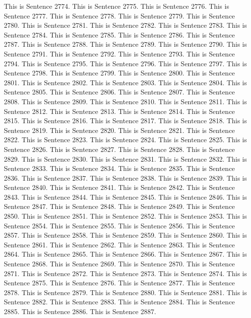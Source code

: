 \documentclass{article}
\begin{document}
This is Sentence 2774.
This is Sentence 2775.
This is Sentence 2776.
This is Sentence 2777.
This is Sentence 2778.
This is Sentence 2779.
This is Sentence 2780.
This is Sentence 2781.
This is Sentence 2782.
This is Sentence 2783.
This is Sentence 2784.
This is Sentence 2785.
This is Sentence 2786.
This is Sentence 2787.
This is Sentence 2788.
This is Sentence 2789.
This is Sentence 2790.
This is Sentence 2791.
This is Sentence 2792.
This is Sentence 2793.
This is Sentence 2794.
This is Sentence 2795.
This is Sentence 2796.
This is Sentence 2797.
This is Sentence 2798.
This is Sentence 2799.
This is Sentence 2800.
This is Sentence 2801.
This is Sentence 2802.
This is Sentence 2803.
This is Sentence 2804.
This is Sentence 2805.
This is Sentence 2806.
This is Sentence 2807.
This is Sentence 2808.
This is Sentence 2809.
This is Sentence 2810.
This is Sentence 2811.
This is Sentence 2812.
This is Sentence 2813.
This is Sentence 2814.
This is Sentence 2815.
This is Sentence 2816.
This is Sentence 2817.
This is Sentence 2818.
This is Sentence 2819.
This is Sentence 2820.
This is Sentence 2821.
This is Sentence 2822.
This is Sentence 2823.
This is Sentence 2824.
This is Sentence 2825.
This is Sentence 2826.
This is Sentence 2827.
This is Sentence 2828.
This is Sentence 2829.
This is Sentence 2830.
This is Sentence 2831.
This is Sentence 2832.
This is Sentence 2833.
This is Sentence 2834.
This is Sentence 2835.
This is Sentence 2836.
This is Sentence 2837.
This is Sentence 2838.
This is Sentence 2839.
This is Sentence 2840.
This is Sentence 2841.
This is Sentence 2842.
This is Sentence 2843.
This is Sentence 2844.
This is Sentence 2845.
This is Sentence 2846.
This is Sentence 2847.
This is Sentence 2848.
This is Sentence 2849.
This is Sentence 2850.
This is Sentence 2851.
This is Sentence 2852.
This is Sentence 2853.
This is Sentence 2854.
This is Sentence 2855.
This is Sentence 2856.
This is Sentence 2857.
This is Sentence 2858.
This is Sentence 2859.
This is Sentence 2860.
This is Sentence 2861.
This is Sentence 2862.
This is Sentence 2863.
This is Sentence 2864.
This is Sentence 2865.
This is Sentence 2866.
This is Sentence 2867.
This is Sentence 2868.
This is Sentence 2869.
This is Sentence 2870.
This is Sentence 2871.
This is Sentence 2872.
This is Sentence 2873.
This is Sentence 2874.
This is Sentence 2875.
This is Sentence 2876.
This is Sentence 2877.
This is Sentence 2878.
This is Sentence 2879.
This is Sentence 2880.
This is Sentence 2881.
This is Sentence 2882.
This is Sentence 2883.
This is Sentence 2884.
This is Sentence 2885.
This is Sentence 2886.
This is Sentence 2887.
\end{document}
